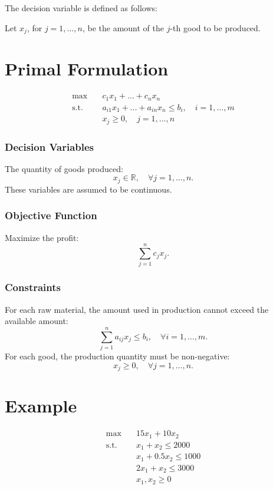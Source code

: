 \documentclass[a4paper, 11pt]{article}
\begin{document}
The decision variable is defined as follows:

Let $x_{j}$, for $j = 1, \dots, n$, be the amount of the $j$-th good to be produced.

\section{Primal Formulation}

\begin{align*}
\max & \quad c_{1}x_{1} + \dots + c_{n}x_{n} \\
\text{s.t.} & \quad a_{i1}x_{1} + \dots + a_{in}x_{n} \leq b_{i}, \quad i=1, \dots, m \\
& \quad x_{j} \geq 0, \quad j=1, \dots, n
\end{align*}

\subsubsection*{Decision Variables}
The quantity of goods produced:
\[ x_{j} \in \mathbb{R}, \quad \forall j=1,\dots,n. \]
These variables are assumed to be continuous.

\subsubsection*{Objective Function}
Maximize the profit:
\[ \sum_{j=1}^{n} c_{j}x_{j}. \]

\subsubsection*{Constraints}
For each raw material, the amount used in production cannot exceed the available amount:
\[ \sum_{j=1}^{n} a_{ij} x_{j} \leq b_{i}, \quad \forall i=1,\dots,m. \]
For each good, the production quantity must be non-negative:
\[ x_{j} \geq 0, \quad \forall j=1,\dots,n. \]

\section{Example}

\begin{align*}
\max & \quad 15x_{1} + 10x_{2} \\
\text{s.t.} & \quad x_{1} + x_{2} \leq 2000 \\
& \quad x_{1} + 0.5x_{2} \leq 1000 \\
& \quad 2x_{1} + x_{2} \leq 3000 \\
& \quad x_{1}, x_{2} \geq 0
\end{align*}
\end{document}
